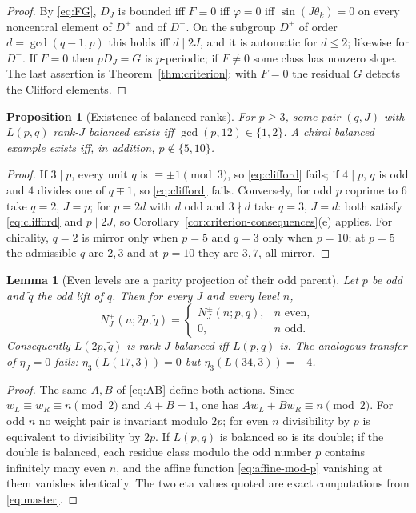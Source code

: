 \documentclass[11pt]{article}
\newtheorem{proposition}[theorem]{Proposition}
\newtheorem{lemma}[theorem]{Lemma}
\theoremstyle{definition}
\begin{document}
\begin{proof}
By \eqref{eq:FG}, $D_J$ is bounded iff $F\equiv0$ iff $\varphi=0$ iff
$\sin(J\theta_k)=0$ on every noncentral element of $D^+$ and of $D^-$.
On the subgroup $D^+$ of order $d=\gcd(q-1,p)$ this holds iff $d\mid2J$,
and it is automatic for $d\leq2$; likewise for $D^-$.  If $F=0$ then
$pD_J=G$ is $p$-periodic; if $F\neq0$ some class has nonzero slope.  The
last assertion is Theorem~\ref{thm:criterion}: with $F=0$ the residual
$G$ detects the Clifford elements.
\end{proof}

\begin{proposition}[Existence of balanced ranks]
\label{prop:existence}
For $p\geq3$, some pair $(q,J)$ with $L(p,q)$ rank-$J$ balanced exists
iff $\gcd(p,12)\in\{1,2\}$.  A chiral balanced example exists iff, in
addition, $p\notin\{5,10\}$.
\end{proposition}

\begin{proof}
If $3\mid p$, every unit $q$ is $\equiv\pm1\pmod3$, so
\eqref{eq:clifford} fails; if $4\mid p$, $q$ is odd and $4$ divides one of
$q\mp1$, so \eqref{eq:clifford} fails.  Conversely, for odd $p$ coprime
to $6$ take $q=2$, $J=p$; for $p=2d$ with $d$ odd and $3\nmid d$ take
$q=3$, $J=d$: both satisfy \eqref{eq:clifford} and $p\mid2J$, so
Corollary~\ref{cor:criterion-consequences}(e) applies.  For chirality,
$q=2$ is mirror only when $p=5$ and $q=3$ only when $p=10$; at $p=5$ the
admissible $q$ are $2,3$ and at $p=10$ they are $3,7$, all mirror.
\end{proof}

\begin{lemma}[Even levels are a parity projection of their odd parent]
\label{lem:parity-projection}
Let $p$ be odd and $\tilde q$ the odd lift of $q$.  Then for every $J$
and every level $n$,
\[
 N^\pm_{J}(n;2p,\tilde q)=
 \begin{cases}N^\pm_J(n;p,q),&n\text{ even},\\0,&n\text{ odd}.\end{cases}
\]
Consequently $L(2p,\tilde q)$ is rank-$J$ balanced iff $L(p,q)$ is.  The
analogous transfer of $\eta_J=0$ fails: $\eta_3(L(17,3))=0$ but
$\eta_3(L(34,3))=-4$.
\end{lemma}

\begin{proof}
The same $A,B$ of \eqref{eq:AB} define both actions.  Since
$w_L\equiv w_R\equiv n\pmod2$ and $A+B=1$, one has
$Aw_L+Bw_R\equiv n\pmod2$.  For odd $n$ no weight pair is invariant
modulo $2p$; for even $n$ divisibility by $p$ is equivalent to
divisibility by $2p$.  If $L(p,q)$ is balanced so is its double; if the
double is balanced, each residue class modulo the odd number $p$ contains
infinitely many even $n$, and the affine function
\eqref{eq:affine-mod-p} vanishing at them vanishes identically.  The two
eta values quoted are exact computations from \eqref{eq:master}.
\end{proof}
\end{document}
